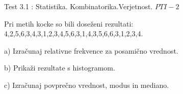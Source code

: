 \documentclass[a4paper,12pt]{letter}
\renewcommand{\headrulewidth}{3pt}
\renewcommand{\headrulewidth}{0.3pt}
\newcounter{tocke}
\begin{document}
\pagestyle{fancy}
\renewcommand\headrulewidth{0pt}
\lhead{}\chead{}\rhead{}
\rfoot{\vspace*{-2\baselineskip}}


\renewcommand{\vec}{\overrightarrow}


\everymath{\displaystyle}
\begin{minipage}{20cm}
\begin{bclogo}[couleur=brown!40,
  arrondi=0,ombre=true, couleurOmbre=gray!50,
logo =\bcplume,
  noborder=true]
{\textrm{{\Large{Test 3.1} \Huge{}:
%
%
\large{Statistika. Kombinatorika.Verjetnost.} \hfill $PTI-2$}}}
\end{bclogo}
\end{minipage}
\begin{minipage}{20cm}
\end{minipage}


\def\tocke2{2+3+(2+1+1)}
\begin{naloga}[\hfill \quad $\tocke2$
\qquad \rightsquigarrow \vert a.\qquad|b.\qquad|c.\qquad|] 
\addtocounter{tocke}{\tocke2}
Pri metih kocke so bili doseženi rezultati: 
4,2,5,6,3,4,3,1,2,3,4,5,6,3,1,4,3,5,6,6,3,1,2,3,4.

a) Izračunaj relativne frekvence za posamično vrednost.

b) Prikaži rezultate s histogramom.

c) Izračunaj povprečno vrednost, modus in mediano.

\end{naloga}
\end{document}
